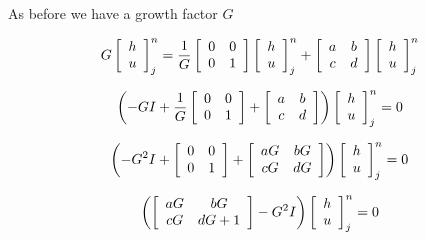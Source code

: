\documentclass[12pt]{article}
\begin{document}
As before we have a growth factor $G$

\begin{multline}
G\left[\begin{array}{c}
h \\
u
\end{array} \right]^{n}_j = \frac{1}{G}\left[\begin{array}{c c}
0 & 0 \\
0 & 1
\end{array} \right]\left[\begin{array}{c}
h \\
u
\end{array} \right]^{n}_j  +\left[\begin{array}{c c}
a & b \\
c & d
\end{array} \right]  \left[\begin{array}{c}
h \\
u
\end{array} \right]^{n}_j 
\end{multline}

\begin{multline}
\left(-GI + \frac{1}{G}\left[\begin{array}{c c}
0 & 0 \\
0 & 1
\end{array} \right] +\left[\begin{array}{c c}
a & b \\
c & d
\end{array} \right]  \right)
\left[\begin{array}{c}
h \\
u
\end{array} \right]^{n}_j  = 0
\end{multline}

\begin{multline}
\left(-G^2I + \left[\begin{array}{c c}
0 & 0 \\
0 & 1
\end{array} \right] +\left[\begin{array}{c c}
aG & bG \\
cG & dG
\end{array} \right]  \right)
\left[\begin{array}{c}
h \\
u
\end{array} \right]^{n}_j  = 0
\end{multline}

\begin{multline}
\left(\left[\begin{array}{c c}
aG & bG \\
cG & dG + 1
\end{array} \right] -G^2I   \right)
\left[\begin{array}{c}
h \\
u
\end{array} \right]^{n}_j  = 0
\end{multline}
\end{document}
